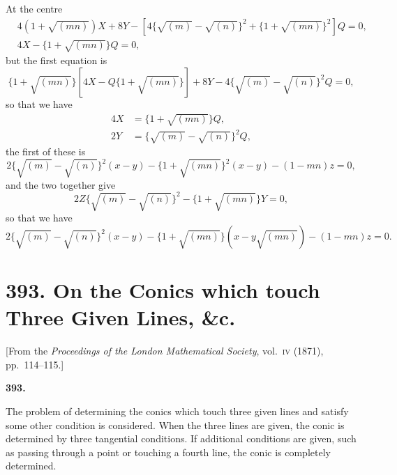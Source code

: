 \documentclass[11pt,a4paper]{article}
\theoremstyle{plain}
\begin{document}
At the centre
\begin{align}
&4(1 + \sqrt{(mn)})X + 8Y - [4\{\sqrt{(m)} - \sqrt{(n)}\}^2 + \{1 + \sqrt{(mn)}\}^2]Q = 0, \\
&4X - \{1 + \sqrt{(mn)}\}Q = 0,
\end{align}
but the first equation is
\begin{equation}
\{1 + \sqrt{(mn)}\}[4X - Q\{1 + \sqrt{(mn)}\}] + 8Y - 4\{\sqrt{(m)} - \sqrt{(n)}\}^2 Q = 0,
\end{equation}
so that we have
\begin{align}
4X &= \{1 + \sqrt{(mn)}\}Q, \\
2Y &= \{\sqrt{(m)} - \sqrt{(n)}\}^2 Q,
\end{align}
the first of these is
\begin{equation}
2\{\sqrt{(m)} - \sqrt{(n)}\}^2(x - y) - \{1 + \sqrt{(mn)}\}^2(x-y) - (1-mn)z = 0,
\end{equation}
and the two together give
\begin{equation}
2Z\{\sqrt{(m)} - \sqrt{(n)}\}^2 - \{1 + \sqrt{(mn)}\}Y = 0,
\end{equation}
so that we have
\begin{equation}
2\{\sqrt{(m)} - \sqrt{(n)}\}^2(x - y) - \{1 + \sqrt{(mn)}\}(x - y\sqrt{(mn)}) - (1-mn)z = 0.
\end{equation}

\newpage

\section*{393. On the Conics which touch Three Given Lines, \&c.}
\label{sec:393}
\begin{center}
[From the \textit{Proceedings of the London Mathematical Society}, vol.~\textsc{iv} (1871), pp.~114--115.]
\end{center}

\setcounter{equation}{0}

\textbf{393.}

The problem of determining the conics which touch three given lines and satisfy some other condition is considered. When the three lines are given, the conic is determined by three tangential conditions. If additional conditions are given, such as passing through a point or touching a fourth line, the conic is completely determined.
\end{document}
